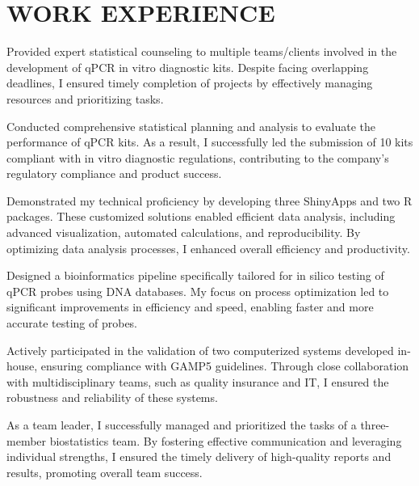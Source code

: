 \documentclass[]{plushcv}
\begin{document}
\begin{minipage}[t]{0.70\textwidth}
\sectionsep

\section{WORK EXPERIENCE}

\begin{tightemize}
\sectionsep
\sectionsep
\item Provided expert statistical counseling to multiple teams/clients involved in the development of qPCR in vitro diagnostic kits. Despite facing overlapping deadlines, I ensured timely completion of projects by effectively managing resources and prioritizing tasks.
\item Conducted comprehensive statistical planning and analysis to evaluate the performance of qPCR kits. As a result, I successfully led the submission of 10 kits compliant with in vitro diagnostic regulations, contributing to the company's regulatory compliance and product success.
\item Demonstrated my technical proficiency by developing three ShinyApps and two R packages. These customized solutions enabled efficient data analysis, including advanced visualization, automated calculations, and reproducibility. By optimizing data analysis processes, I enhanced overall efficiency and productivity.
\item Designed a bioinformatics pipeline specifically tailored for in silico testing of qPCR probes using DNA databases. My focus on process optimization led to significant improvements in efficiency and speed, enabling faster and more accurate testing of probes.
\item Actively participated in the validation of two computerized systems developed in-house, ensuring compliance with GAMP5 guidelines. Through close collaboration with multidisciplinary teams, such as quality insurance and IT, I ensured the robustness and reliability of these systems.
\item As a team leader, I successfully managed and prioritized the tasks of a three-member biostatistics team. By fostering effective communication and leveraging individual strengths, I ensured the timely delivery of high-quality reports and results, promoting overall team success.

\end{tightemize}
\sectionsep
\sectionsep


%
%

\end{minipage} 
\end{document}
